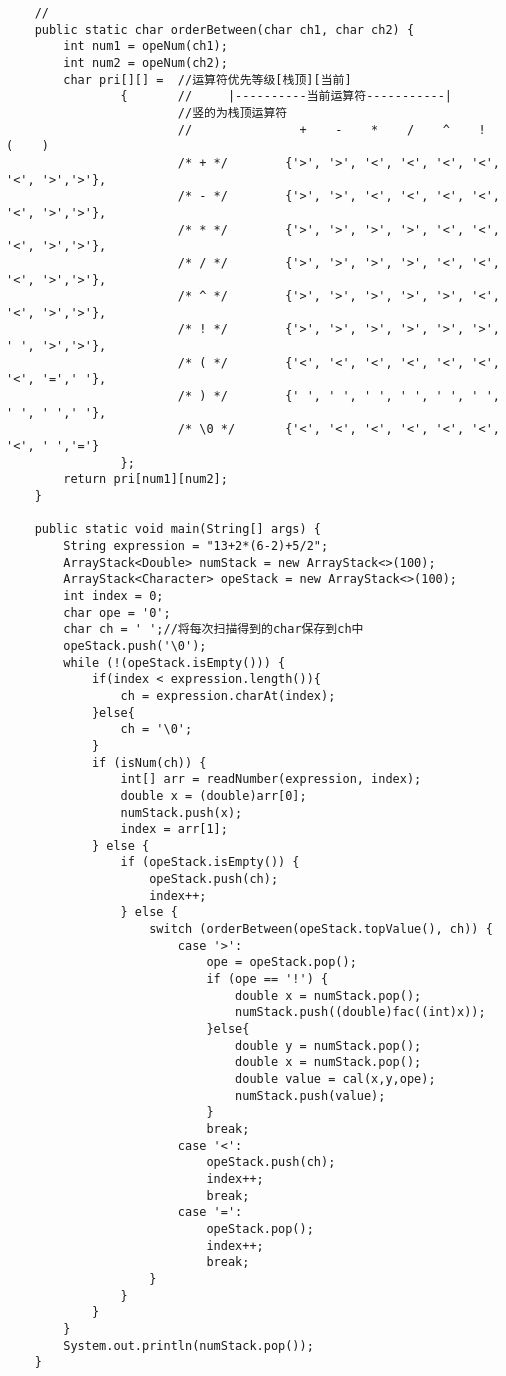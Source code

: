\documentclass[a4paper]{report}
\begin{document}
\begin{lstlisting}
    //
    public static char orderBetween(char ch1, char ch2) {
        int num1 = opeNum(ch1);
        int num2 = opeNum(ch2);
        char pri[][] =  //运算符优先等级[栈顶][当前]
                {       //     |----------当前运算符-----------|
                        //竖的为栈顶运算符
                        //               +    -    *    /    ^    !    (    )
                        /* + */        {'>', '>', '<', '<', '<', '<', '<', '>','>'},
                        /* - */        {'>', '>', '<', '<', '<', '<', '<', '>','>'},
                        /* * */        {'>', '>', '>', '>', '<', '<', '<', '>','>'},
                        /* / */        {'>', '>', '>', '>', '<', '<', '<', '>','>'},
                        /* ^ */        {'>', '>', '>', '>', '>', '<', '<', '>','>'},
                        /* ! */        {'>', '>', '>', '>', '>', '>', ' ', '>','>'},
                        /* ( */        {'<', '<', '<', '<', '<', '<', '<', '=',' '},
                        /* ) */        {' ', ' ', ' ', ' ', ' ', ' ', ' ', ' ',' '},
                        /* \0 */       {'<', '<', '<', '<', '<', '<', '<', ' ','='}
                };
        return pri[num1][num2];
    }

    public static void main(String[] args) {
        String expression = "13+2*(6-2)+5/2";
        ArrayStack<Double> numStack = new ArrayStack<>(100);
        ArrayStack<Character> opeStack = new ArrayStack<>(100);
        int index = 0;
        char ope = '0';
        char ch = ' ';//将每次扫描得到的char保存到ch中
        opeStack.push('\0');
        while (!(opeStack.isEmpty())) {
            if(index < expression.length()){
                ch = expression.charAt(index);
            }else{
                ch = '\0';
            }
            if (isNum(ch)) {
                int[] arr = readNumber(expression, index);
                double x = (double)arr[0];
                numStack.push(x);
                index = arr[1];
            } else {
                if (opeStack.isEmpty()) {
                    opeStack.push(ch);
                    index++;
                } else {
                    switch (orderBetween(opeStack.topValue(), ch)) {
                        case '>':
                            ope = opeStack.pop();
                            if (ope == '!') {
                                double x = numStack.pop();
                                numStack.push((double)fac((int)x));
                            }else{
                                double y = numStack.pop();
                                double x = numStack.pop();
                                double value = cal(x,y,ope);
                                numStack.push(value);
                            }
                            break;
                        case '<':
                            opeStack.push(ch);
                            index++;
                            break;
                        case '=':
                            opeStack.pop();
                            index++;
                            break;
                    }
                }
            }
        }
        System.out.println(numStack.pop());
    }


\end{lstlisting}
\end{document}
